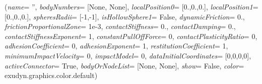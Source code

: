 %
\begin{flushleft}
\label{sec:mainsystemextensions:CreateSphereSphereContact}
({\it name}= '', {\it bodyNumbers}= [None, None], {\it localPosition0}= [0.,0.,0.], {\it localPosition1}= [0.,0.,0.], {\it spheresRadii}= [-1,-1], {\it isHollowSphere1}= False, {\it dynamicFriction}= 0., {\it frictionProportionalZone}= 1e-3, {\it contactStiffness}= 0., {\it contactDamping}= 0., {\it contactStiffnessExponent}= 1, {\it constantPullOffForce}= 0, {\it contactPlasticityRatio}= 0, {\it adhesionCoefficient}= 0, {\it adhesionExponent}= 1, {\it restitutionCoefficient}= 1, {\it minimumImpactVelocity}= 0, {\it impactModel}= 0, {\it dataInitialCoordinates}= [0,0,0,0], {\it activeConnector}= True, {\it bodyOrNodeList}= [None, None], {\it show}= False, {\it color}= exudyn.graphics.color.default)
\end{flushleft}
\setlength{\itemindent}{0.7cm}
